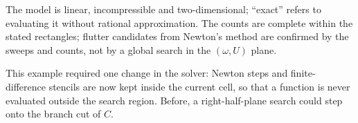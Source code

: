 The model is linear, incompressible and two-dimensional; ``exact'' refers to
evaluating it without rational approximation. The counts are complete within
the stated rectangles; flutter candidates from Newton's method are confirmed
by the sweeps and counts, not by a global search in the $(\omega,U)$ plane.

\begin{remark}
This example required one change in the solver: Newton steps and
finite-difference stencils are now kept inside the current cell, so that a
function is never evaluated outside the search region. Before, a
right-half-plane search could step onto the branch cut of $C$.
\end{remark}
